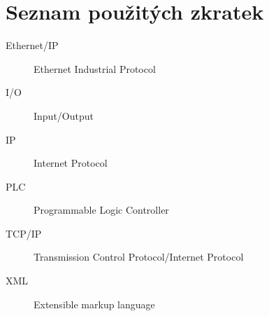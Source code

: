 \chapter{Seznam použitých zkratek}
\begin{description}
	\item[Ethernet/IP] Ethernet Industrial Protocol
	\item[I/O] Input/Output
	\item[IP] Internet Protocol 
	\item[PLC] Programmable Logic Controller
	\item[TCP/IP] Transmission Control Protocol/Internet Protocol 
	\item[XML] Extensible markup language
\end{description}